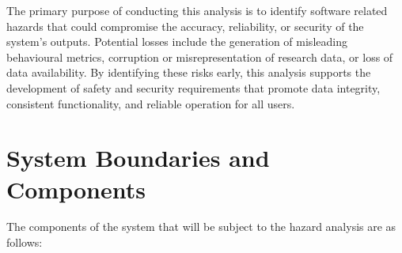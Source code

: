 \documentclass{article}
\begin{document}
The primary purpose of conducting this analysis is to identify software related hazards that could compromise the accuracy, reliability, or security of the system’s outputs. Potential losses include the generation of misleading behavioural metrics, corruption or misrepresentation of research data, or loss of data availability. By identifying these risks early, this analysis supports the development of safety and security requirements that promote data integrity, consistent functionality, and reliable operation for all users.


\section{System Boundaries and Components}


\par{ The components of the system that will be subject to the hazard analysis are as follows:}
\end{document}
